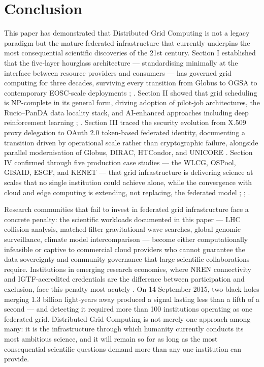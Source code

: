 \documentclass[12pt,a4paper]{report}
\begin{document}
\section*{Conclusion}
This paper has demonstrated that Distributed Grid Computing is not a legacy paradigm but the mature federated infrastructure that currently 
underpins the most consequential scientific discoveries of the 21st century. Section I established that the five-layer hourglass 
architecture — standardising minimally at the interface between resource providers and consumers — has governed grid computing for three decades, 
surviving every transition from Globus to OGSA to contemporary EOSC-scale deployments \parencite{foster2001}; \parencite{grigoryeva2024}.
 Section II showed that grid scheduling is NP-complete in its general form, driving adoption of pilot-job architectures, the Rucio–PanDA data locality 
 stack, and AI-enhanced approaches including deep reinforcement learning \parencite{hegde2024}; \parencite{maeno2024panda}. Section III traced the security 
 evolution from X.509 proxy delegation to OAuth 2.0 token-based federated identity, documenting a transition driven by operational scale rather than 
 cryptographic failure, alongside parallel modernisation of Globus, DIRAC, HTCondor, and UNICORE \parencite{dack2024wlcg}. Section IV 
 confirmed through five production case studies — the WLCG, OSPool, GISAID, ESGF, and KENET — that grid infrastructure is delivering science at scales 
 that no single institution could achieve alone, while the convergence with cloud and edge computing is extending, not replacing, the federated
  model \parencite{atlas2025software}; \parencite{petrie2021cmip6}; \parencite{murumba2017kenyan}.

Research communities that fail to invest in federated grid infrastructure face a concrete penalty: the scientific workloads documented in this 
paper — LHC collision analysis, matched-filter gravitational wave searches, global genomic surveillance, climate model intercomparison — become 
either computationally infeasible or captive to commercial cloud providers who cannot guarantee the data sovereignty and community governance that 
large scientific collaborations require. Institutions in emerging research economies, where NREN connectivity and IGTF-accredited credentials are 
the difference between participation and exclusion, face this penalty most acutely \parencite{murumba2017kenyan}. On 14 September 2015, two black holes 
merging 1.3 billion light-years away produced a signal lasting less than a fifth of a second — and detecting it required more than 100 institutions 
operating as one federated grid. Distributed Grid Computing is not merely one approach among many: it is the infrastructure through which humanity 
currently conducts its most ambitious science, and it will remain so for as long as the most consequential scientific questions demand more than 
any one institution can provide.


\newpage
\printbibliography[title={References}]
\end{document}
